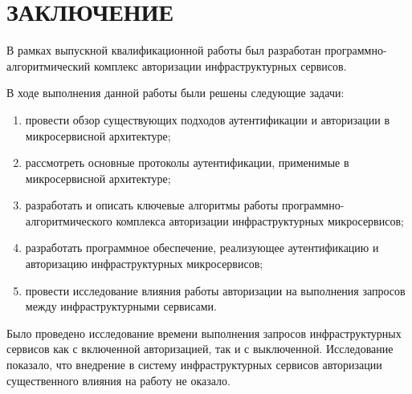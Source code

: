{\centering \chapter*{ЗАКЛЮЧЕНИЕ}}

В рамках выпускной квалификационной работы был разработан программно-алгоритмический комплекс авторизации инфраструктурных сервисов.

В ходе выполнения данной работы были решены следующие задачи:
\begin{enumerate}
\item провести обзор существующих подходов аутентификации и авторизации в микросервисной архитектуре;
\item рассмотреть основные протоколы аутентификации, применимые в микросервисной архитектуре;
\item разработать и описать ключевые алгоритмы работы программно-алгоритмического комплекса авторизации инфраструктурных микросервисов;
\item разработать программное обеспечение, реализующее аутентификацию и авторизацию инфраструктурных микросервисов;
\item провести исследование влияния работы авторизации на выполнения запросов между инфраструктурными сервисами.
\end{enumerate}

Было проведено исследование времени выполнения запросов инфраструктурных сервисов как с включенной авторизацией, так и с выключенной. Исследование показало, что внедрение в систему инфраструктурных сервисов авторизации существенного влияния на работу не оказало.
